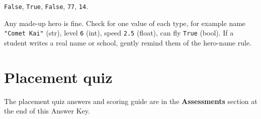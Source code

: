 \begin{answer}
\texttt{False}, \texttt{True}, \texttt{False}, \texttt{77}, \texttt{14}.
\end{answer}

\begin{answer}
Any made-up hero is fine. Check for one value of each type, for example
name \texttt{"Comet Kai"} (str), level \texttt{6} (int), speed \texttt{2.5} (float), can fly \texttt{True} (bool).
If a student writes a real name or school, gently remind them of the hero-name rule.
\end{answer}

\section{Placement quiz}
The placement quiz answers and scoring guide are in the \textbf{Assessments} section at the end of this Answer Key.
